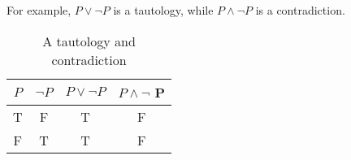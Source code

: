 \documentclass{article}[12pt]
\begin{document}
            For example, $P \lor \neg P$ is a tautology, while $P \land \neg P$ is a contradiction.
            \begin{table}[!ht]
                \centering
                \begin{tabular}{|c|c|c|c|}
                     \hline
                     $P$ & $\neg P$ & 
                     $P \lor \neg P$ &
                     $P \land \neg$ P
                     \\ \hline\hline
                     T & F & 
                     T & F
                     \\ \hline
                     F & T & 
                     T & F
                     \\ \hline
                \end{tabular}
                \caption{A tautology and contradiction}
            \end{table}
            
\end{document}
